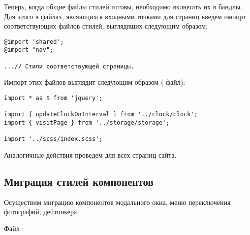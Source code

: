 \documentclass[a4paper,14pt]{extarticle}
\begin{document}
Теперь, когда общие файлы стилей готовы, необходимо включить их в бандлы.
Для этого в  файлах, являющихся входными точками для страниц
введем импорт соответствующих файлов стилей, выглядящих следующим образом:

\begin{lstlisting}
@import 'shared';
@import "nav";

...// Стили соответствующей страницы.
\end{lstlisting}

Импорт этих файлов выглядит следующим образом ( файл):

\begin{lstlisting}
import * as $ from 'jquery';

import { updateClockOnInterval } from '../clock/clock';
import { visitPage } from '../storage/storage';

import '../scss/index.scss';
\end{lstlisting}

Аналогичные действия проведем для всех страниц сайта.

\subsection{Миграция стилей компонентов}
Осуществим миграцию компонентов модального окна, меню переключения фотографий,
дейтпикера.

Файл :
\end{document}
